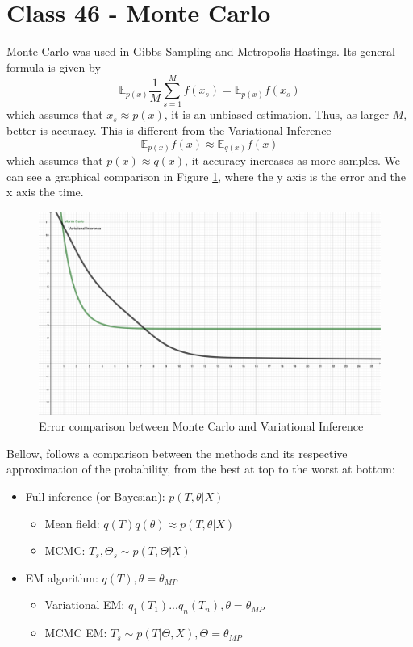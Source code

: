 \documentclass{article}
\begin{document}
\section{Class 46 - Monte Carlo}
Monte Carlo was used in Gibbs Sampling and Metropolis Hastings. Its general formula is given by
\begin{equation}
    \mathbb{E}_{p(x)}\frac{1}{M}\sum_{s=1}^M f(x_s) = \mathbb{E}_{p(x)}f(x_s)
\end{equation}
which assumes that $x_s \approx p(x)$, it is an unbiased estimation. Thus, as larger $M$, better is accuracy. This is different from the Variational Inference
\begin{equation}
    \mathbb{E}_{p(x)}f(x) \approx \mathbb{E}_{q(x)}f(x)
\end{equation}
which assumes that $p(x) \approx q(x)$, it accuracy increases as more samples. We can see a graphical comparison in Figure \ref{fig:MCError}, where the y axis is the error and the x axis the time.
\begin{figure}
    \centering
    \includegraphics[width=\textwidth]{MCError.pdf}
    \caption{Error comparison between Monte Carlo and Variational Inference}
    \label{fig:MCError}
\end{figure}
Bellow, follows a comparison between the methods and its respective approximation of the probability, from the best at top to the worst at bottom:
\begin{itemize}
    \item Full inference (or Bayesian): $p(T, \theta| X)$
    \begin{itemize}
        \item Mean field: $q(T)q(\theta) \approx p(T, \theta| X)$
        \item MCMC: $T_s, \Theta_s \sim p(T, \Theta| X)$
    \end{itemize}
    \item EM algorithm: $q(T), \theta = \theta_{MP}$
    \begin{itemize}
        \item Variational EM: $q_1(T_1)...q_n(T_n), \theta = \theta_{MP}$
        \item MCMC EM: $T_s \sim p(T|\Theta, X), \Theta = \theta_{MP}$
    \end{itemize}
\end{itemize}
\end{document}
